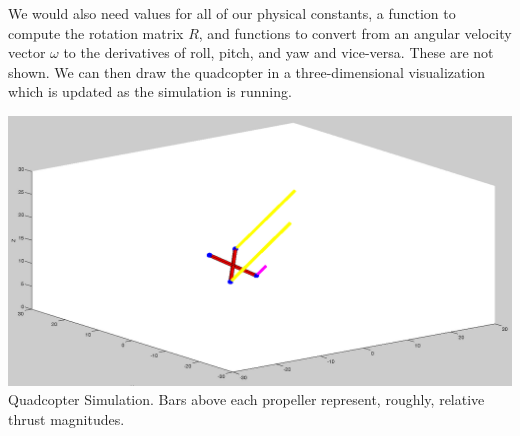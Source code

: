 \documentclass{article}
\begin{document}
We would also need values for all of our physical constants, a function to compute the rotation
matrix $R$, and functions to convert from an angular velocity vector $\omega$ to the derivatives of
roll, pitch, and yaw and vice-versa. These are not shown. We can then draw the quadcopter in a
three-dimensional visualization which is updated as the simulation is running.
\begin{center}
    \includegraphics[scale=0.3]{images/simulation.png} \\
    {
        Quadcopter Simulation. Bars above each propeller represent, roughly, relative thrust magnitudes.
    }
\end{center}
\end{document}
